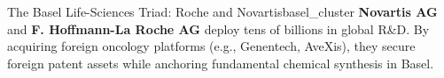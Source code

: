 \begin{mnecase}{The Basel Life-Sciences Triad: Roche and Novartis}{basel_cluster}
\textbf{Novartis AG} and \textbf{F. Hoffmann-La Roche AG} deploy tens of billions in global R\&D. By acquiring foreign oncology platforms (e.g., Genentech, AveXis), they secure foreign patent assets while anchoring fundamental chemical synthesis in Basel.
\end{mnecase}
